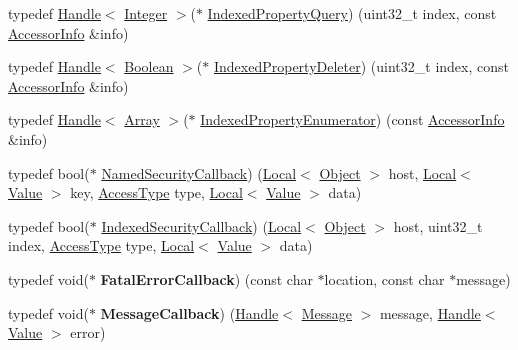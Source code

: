 \begin{DoxyCompactItemize}
\item 
typedef \hyperlink{classv8_1_1_handle}{Handle}$<$ \hyperlink{classv8_1_1_integer}{Integer} $>$($\ast$ \hyperlink{namespacev8_ac84ffd0beb05009f30378ef45a065edf}{Indexed\+Property\+Query}) (uint32\+\_\+t index, const \hyperlink{classv8_1_1_accessor_info}{Accessor\+Info} \&info)
\item 
typedef \hyperlink{classv8_1_1_handle}{Handle}$<$ \hyperlink{classv8_1_1_boolean}{Boolean} $>$($\ast$ \hyperlink{namespacev8_a3a7c18d62a0d1f2d12845051920be592}{Indexed\+Property\+Deleter}) (uint32\+\_\+t index, const \hyperlink{classv8_1_1_accessor_info}{Accessor\+Info} \&info)
\item 
typedef \hyperlink{classv8_1_1_handle}{Handle}$<$ \hyperlink{classv8_1_1_array}{Array} $>$($\ast$ \hyperlink{namespacev8_a15ab299eff53946ab483b762a4cb20dc}{Indexed\+Property\+Enumerator}) (const \hyperlink{classv8_1_1_accessor_info}{Accessor\+Info} \&info)
\item 
typedef bool($\ast$ \hyperlink{namespacev8_ab5cafda0c556bba990c660ce9c904e0d}{Named\+Security\+Callback}) (\hyperlink{classv8_1_1_local}{Local}$<$ \hyperlink{classv8_1_1_object}{Object} $>$ host, \hyperlink{classv8_1_1_local}{Local}$<$ \hyperlink{classv8_1_1_value}{Value} $>$ key, \hyperlink{namespacev8_add8bef6469c5b94706584124e610046c}{Access\+Type} type, \hyperlink{classv8_1_1_local}{Local}$<$ \hyperlink{classv8_1_1_value}{Value} $>$ data)
\item 
typedef bool($\ast$ \hyperlink{namespacev8_aebbcc7837753e51112d944ad96520da1}{Indexed\+Security\+Callback}) (\hyperlink{classv8_1_1_local}{Local}$<$ \hyperlink{classv8_1_1_object}{Object} $>$ host, uint32\+\_\+t index, \hyperlink{namespacev8_add8bef6469c5b94706584124e610046c}{Access\+Type} type, \hyperlink{classv8_1_1_local}{Local}$<$ \hyperlink{classv8_1_1_value}{Value} $>$ data)
\item 
\hypertarget{namespacev8_abc93f69508701f18dc5cc0ce165616aa}{}typedef void($\ast$ {\bfseries Fatal\+Error\+Callback}) (const char $\ast$location, const char $\ast$message)\label{namespacev8_abc93f69508701f18dc5cc0ce165616aa}

\item 
\hypertarget{namespacev8_a26f4f3ae680876d9408a11d86f4e543d}{}typedef void($\ast$ {\bfseries Message\+Callback}) (\hyperlink{classv8_1_1_handle}{Handle}$<$ \hyperlink{classv8_1_1_message}{Message} $>$ message, \hyperlink{classv8_1_1_handle}{Handle}$<$ \hyperlink{classv8_1_1_value}{Value} $>$ error)\label{namespacev8_a26f4f3ae680876d9408a11d86f4e543d}


\end{DoxyCompactItemize}

